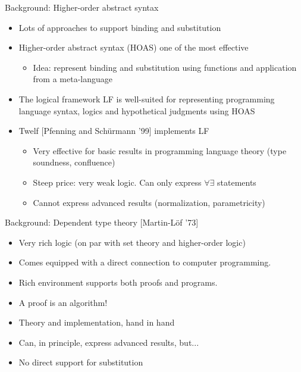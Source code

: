 \documentclass[usenames,dvipsnames]{beamer}
\begin{document}
\begin{frame}{Background: Higher-order abstract syntax}
\begin{itemize}
\item Lots of approaches to support binding and substitution
\item Higher-order abstract syntax (HOAS) one of the most effective
\begin{itemize}
\item Idea: represent binding and substitution using functions and application from a meta-language
\end{itemize}
\item The logical framework LF is well-suited for representing
programming language syntax, logics and hypothetical
judgments using HOAS
\item Twelf [Pfenning and Sch\"urmann '99] implements LF
\begin{itemize}
\item Very effective for basic results in programming language theory (type soundness, confluence)
\item Steep price: very weak logic. Can only express $\forall\exists$ statements
\item Cannot express advanced results (normalization, parametricity)
\end{itemize}
\end{itemize}
\end{frame}

\begin{frame}{Background: Dependent type theory [Martin-L\"of '73]}
\begin{itemize}
\item Very rich logic (on par with set theory and higher-order logic)
\item Comes equipped with a direct
connection to computer programming.
\item Rich environment supports both proofs and programs.
\item A proof is an algorithm!
\item Theory and implementation, hand in hand
\item Can, in principle, express advanced results, but...
\item No direct support for substitution
\end{itemize}
\end{frame}
\end{document}
